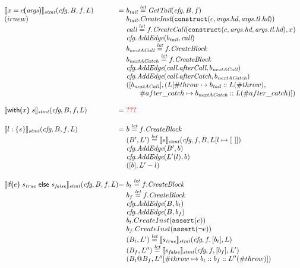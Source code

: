 \[
\begin{array}{l@{}l@{~}l}
\transfun{\ircfgnew{x}{c}{\emph{args}}}_{\emph{stmt}}(\emph{cfg}, B, f, L) & = &
b_{\emph{tail}} \letval \GetTail(\emph{cfg}, B, f)\\
(irnew)
& & b_{\emph{tail}}.\emph{CreateInst}(\TT{construct}(c,\emph{args.hd},\emph{args.tl.hd}))\\
& & \emph{call} \letval f.\emph{CreateCall}(\TT{construct}(c,\emph{args.hd},\emph{args.tl.hd}), x)\\
& & \emph{cfg}.\emph{AddEdge}(b_{\emph{tail}}, \emph{call})\\
& & b_{\emph{nextACall}} \letval f.\emph{CreateBlock}\\
& & b_{\emph{nextACatch}} \letval f.\emph{CreateBlock}\\
& & \emph{cfg}.\emph{AddEdge}(\emph{call}.\emph{afterCall}, b_\emph{nextACall})\\
& & \emph{cfg}.\emph{AddEdge}(\emph{call}.\emph{afterCatch}, b_\emph{nextACatch})\\
& & ([b_{\emph{nextACall}}],(L[\# throw \mapsto b_{\emph{tail}} :: L(\# throw),\\
& & \phantom{ifif} \# after\_catch \mapsto b_{\emph{nextACatch}} :: L(\# after\_catch)])\\
& & \\

\transfun{\ircfgwith{x}{s}}_{\emph{stmt}}(\emph{cfg}, B, f, L) & = &
{\inred ???} \\
& & \\

\transfun{\irlabel{l}{s}}_{\emph{stmt}}(\emph{cfg}, B, f, L) & = &
b \letval f.\emph{CreateBlock}\\\
& & (B', L') \letval \transfun{s}_{\emph{stmt}}(\emph{cfg}, f, B, L[l\mapsto[\ ]])\\
& & \emph{cfg}.\emph{AddEdge}(B', b)\\
& & \emph{cfg}.\emph{AddEdge}(L'(l), b)\\
& & ([b], L' - l) \\
& & \\

\transfun{\irifelse{e}{s_{\emph{true}}}{s_{\emph{false}}}}_{\emph{stmt}}(\emph{cfg}, B, f, L) & = &
b_t \letval f.\emph{CreateBlock}\\
& & b_f \letval f.\emph{CreateBlock}\\
& & \emph{cfg}.\emph{AddEdge}(B,b_t)\\
& & \emph{cfg}.\emph{AddEdge}(B,b_f)\\
& & b_t.CreateInst(\TT{assert}(e))\\
& & b_f.CreateInst(\TT{assert}(\neg e))\\
& & (B_t, L') \letval \transfun{s_{\emph{true}}}_{\emph{stmt}}(\emph{cfg}, f, [b_t], L)\\
& & (B_f, L'') \letval \transfun{s_{\emph{false}}}_{\emph{stmt}}(\emph{cfg}, f, [b_f], L')\\
& & (B_t @ B_f,L''[\#throw \mapsto b_t :: b_f :: L''(\#throw)])\\
& & \\


\end{array}\]
